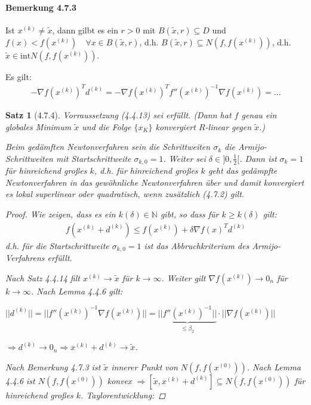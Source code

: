 \documentclass[ngerman,halfparskip]{scrartcl}
\newtheorem*{satz}{Satz}
\theoremstyle{definition}
\newcommand*{\N}{\mathbb{N}}      %
\begin{document}
\paragraph{Bemerkung 4.7.3} Ist $x^{(k)}\neq \tilde x$, dann gilbt es ein $r>0$ mit $B(\tilde x, r)\subseteq D$ und $f(x)<f(x^{(k)})\quad \forall x\in B(\tilde x, r)$, d.h. $B(\tilde x, r)\subseteq N(f,f(x^{(k)}))$, d.h. $\tilde x\in \text{int}N(f,f(x^{(k)}))$.

Es gilt:
\begin{gather*}\tag{4.7.3}
-\nabla f(x^{(k)})^Td^{(k)}=-\nabla f(x^{(k)})^T f''(x^{(k)})^{-1}\nabla f(x^{(k)})=...
\end{gather*}

\begin{satz}[4.7.4]
Vorraussetzung (4.4.13) sei erfüllt. (Dann hat $f$ genau ein globales Minimum $\tilde x$ und die Folge $\{x_K\}$ konvergiert $R$-linear gegen $\tilde x$.)

Beim gedämften Newtonverfahren sein die Schrittweiten $\sigma_k$ die Armijo-Schrittweiten mit Startschrittweite $\sigma_{k,0}=1$. Weiter sei $\delta\in]0,\frac 12[$. Dann ist $\sigma_k=1$ für hinreichend großes $k$, d.h. für hinreichend großes $k$ geht das gedämpfte Newtonverfahren in das gewöhnliche Newtonverfahren über und damit konvergiert es lokal superlinear oder quadratisch, wenn zusätzlich (4.7.2) gilt.

\begin{proof}
Wie zeigen, dass es ein $k(\delta)\in\N$ gibt, so dass für $k\geq k(\delta)$ gilt:
\begin{gather*}\tag{1}
f(x^{(k)}+d^{(k)})\leq f(x^{(k)})+\delta \nabla f(x)^Td^{(k)}
\end{gather*}
 d.h. für die Startschrittweite $\sigma_{k,0}=1$ ist das Abbruchkriterium des Armijo-Verfahrens erfüllt.
 
 Nach Satz 4.4.14 filt $x^{(k)}\rightarrow \tilde x$ für $k\rightarrow \infty$. Weiter gilt $\nabla f (x^{(k)})\rightarrow 0_n$ für $k\rightarrow \infty$. Nach Lemma  4.4.6 gilt:
 
 $||d^{(k)}||=||f''(x^{(k)})^{-1}\nabla f (x^{(k)})||=\underbrace{||f''(x^{(k)})^{-1}||}_{\leq \beta_2}\cdot ||\nabla f (x^{(k)})||$
 
 $\Rightarrow d^{(k)}\rightarrow 0_n \Rightarrow x^{(k)}+d^{(k)}\rightarrow \tilde x$.
 
 Nach Bemerkung 4.7.3 ist $\tilde x$ innerer Punkt von $N(f,f(x^{(0)}))$. Nach Lemma 4.4.6 ist $N(f,f(x^{(0)}))$ konvex $\Rightarrow [\tilde x,x^{(k)}+d^{(k)} ]\subseteq N(f,f(x^{(0)}))$ für hinreichend großes $k$. Taylorentwicklung:
 

\end{proof}
\end{satz}
\end{document}
